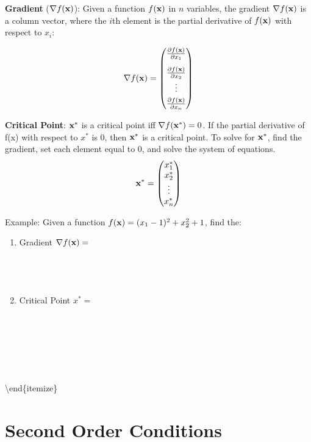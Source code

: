 \documentclass[]{book}
\newcommand{\fx}{f({\bf x})}
\theoremstyle{definition}
\theoremstyle{definition}
\theoremstyle{definition}
\theoremstyle{remark}
\begin{document}
\textbf{Gradient} (\(\nabla \fx\)): Given a function \(f({\bf x})\) in
\(n\) variables, the gradient \(\nabla \fx\) is a column vector, where
the \(i\)th element is the partial derivative of \(f({\bf x})\) with
respect to \(x_i\):

\[\nabla \fx = \begin{pmatrix}
\frac{\partial \fx}{\partial x_1}\\[9pt] \frac{\partial \fx}{\partial x_2}\\
  \vdots \\[3pt] \frac{\partial \fx}{\partial x_n} \end{pmatrix}\]

\textbf{Critical Point}: \({\bf x}^*\) is a critical point iff
\(\nabla f({\bf x}^*)=0\). If the partial derivative of f(x) with
respect to \(x^*\) is 0, then \({\bf x}^*\) is a critical point. To
solve for \({\bf x}^*\), find the gradient, set each element equal to 0,
and solve the system of equations.
\[{\bf x}^* = \begin{pmatrix} x_1^*\\x_2^*\\ \vdots \\ x_n^*\end{pmatrix}\]

Example: Given a function \(\fx=(x_1-1)^2+x_2^2+1\), find the:

\begin{enumerate}
  \item Gradient $\nabla \fx =$ 
  $$\phantom{\begin{pmatrix}
    \frac{\partial \fx}{\partial x_1}\\[9pt] \frac{\partial \fx}
    {\partial x_2} \end{pmatrix}
    = \begin{pmatrix}
    2(x_1-1)\\ 2x_2 \end{pmatrix}}$$

  \item Critical Point $x^* =$
  $$\phantom{\frac{\partial \fx}{\partial x_1} = 2(x_1-1) = 0 
  \Rightarrow x_1^* = 1}$$
  $$\phantom{\frac{\partial \fx}{\partial x_2} = 2x_2 = 0 \Rightarrow 
  x_2^* = 0}$$
  $$\phantom{{\bf x}^* = (1,0)}$$
  \end{enumerate}

\textbackslash{}end\{itemize\}

\section{Second Order Conditions}\label{second-order-conditions}
\end{document}
